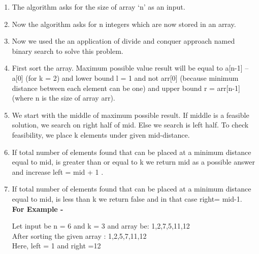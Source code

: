 \documentclass[conference]{IEEEtran}
\begin{document}
\begin{enumerate}

\item The algorithm asks for the size of array ‘n’ as an input.\\

\item Now the algorithm asks for n integers which are now stored in an array.\\

\item Now we used the an application of divide and conquer approach named binary search to solve this problem.
\\

\item First sort the array. Maximum possible value result will be equal to a[n-1] –a[0] (for k = 2) and lower bound l = 1 and not arr[0] (because minimum distance between each element can  be one) and upper bound r = arr[n-1] (where n is the size of array arr). \\

\item We start with the middle of maximum possible result. If middle is a feasible  solution, we search on right half of mid. Else we search is left half. To check  feasibility, we place k elements under given mid-distance.
\\

\item If total number of elements found that can be placed at a minimum distance equal  to mid, is greater than or equal to k we return mid as a possible answer and  increase left = mid + 1 .
\\

\item If total number of elements found that can be placed at a minimum distance equal  to mid, is less than  k we return false and in that case right= mid-1.\\



\textbf{For Example - }


Let input be
n = 6 and k = 3 and array be: {1,2,7,5,11,12} 
 \\

After sorting the given array : {1,2,5,7,11,12}\\
Here, left = 1 and right =12\\



\end{enumerate}
\end{document}
